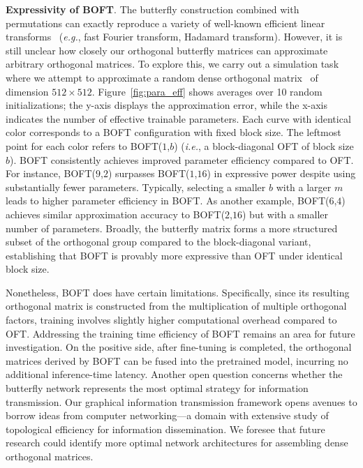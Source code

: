 \textbf{Expressivity of BOFT}. The butterfly construction combined with permutations can exactly reproduce a variety of well-known efficient linear transforms~\cite{dao2019learning,dao2019kaleidoscope} (\emph{e.g.}, fast Fourier transform, Hadamard transform). However, it is still unclear how closely our orthogonal butterfly matrices can approximate arbitrary orthogonal matrices. To explore this, we carry out a simulation task where we attempt to approximate a random dense orthogonal matrix~\cite{anderson1987generation} of dimension $512\times 512$. Figure~\ref{fig:para_eff} shows averages over 10 random initializations; the y-axis displays the approximation error, while the x-axis indicates the number of effective trainable parameters. Each curve with identical color corresponds to a BOFT configuration with fixed block size. The leftmost point for each color refers to BOFT($1$,$b$) (\emph{i.e.}, a block-diagonal OFT of block size $b$). BOFT consistently achieves improved parameter efficiency compared to OFT. For instance, BOFT($9$,$2$) surpasses BOFT($1$,$16$) in expressive power despite using substantially fewer parameters. Typically, selecting a smaller $b$ with a larger $m$ leads to higher parameter efficiency in BOFT. As another example, BOFT($6$,$4$) achieves similar approximation accuracy to BOFT($2$,$16$) but with a smaller number of parameters. Broadly, the butterfly matrix forms a more structured subset of the orthogonal group compared to the block-diagonal variant, establishing that BOFT is provably more expressive than OFT under identical block size.

Nonetheless, BOFT does have certain limitations. Specifically, since its resulting orthogonal matrix is constructed from the multiplication of multiple orthogonal factors, training involves slightly higher computational overhead compared to OFT. Addressing the training time efficiency of BOFT remains an area for future investigation. On the positive side, after fine-tuning is completed, the orthogonal matrices derived by BOFT can be fused into the pretrained model, incurring no additional inference-time latency. Another open question concerns whether the butterfly network represents the most optimal strategy for information transmission. Our graphical information transmission framework opens avenues to borrow ideas from computer networking—a domain with extensive study of topological efficiency for information dissemination. We foresee that future research could identify more optimal network architectures for assembling dense orthogonal matrices.


